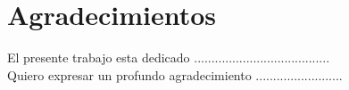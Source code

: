 \chapter*{Agradecimientos}

El presente trabajo esta dedicado .......................................\\

Quiero expresar un profundo agradecimiento .........................

